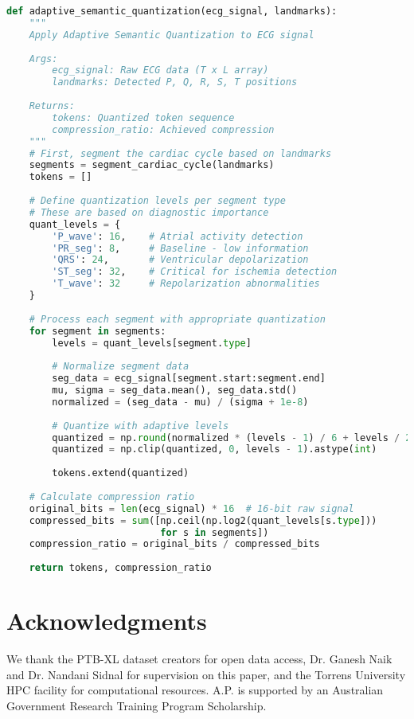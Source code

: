 \documentclass[journal]{IEEEtran}
\begin{document}
\begin{lstlisting}[language=Python, caption={Core ASQ Quantization Implementation}, label=lst:asq]
def adaptive_semantic_quantization(ecg_signal, landmarks):
    """
    Apply Adaptive Semantic Quantization to ECG signal
    
    Args:
        ecg_signal: Raw ECG data (T x L array)
        landmarks: Detected P, Q, R, S, T positions
    
    Returns:
        tokens: Quantized token sequence
        compression_ratio: Achieved compression
    """
    # First, segment the cardiac cycle based on landmarks
    segments = segment_cardiac_cycle(landmarks)
    tokens = []
    
    # Define quantization levels per segment type
    # These are based on diagnostic importance
    quant_levels = {
        'P_wave': 16,    # Atrial activity detection
        'PR_seg': 8,     # Baseline - low information
        'QRS': 24,       # Ventricular depolarization
        'ST_seg': 32,    # Critical for ischemia detection
        'T_wave': 32     # Repolarization abnormalities
    }
    
    # Process each segment with appropriate quantization
    for segment in segments:
        levels = quant_levels[segment.type]
        
        # Normalize segment data
        seg_data = ecg_signal[segment.start:segment.end]
        mu, sigma = seg_data.mean(), seg_data.std()
        normalized = (seg_data - mu) / (sigma + 1e-8)
        
        # Quantize with adaptive levels
        quantized = np.round(normalized * (levels - 1) / 6 + levels / 2)
        quantized = np.clip(quantized, 0, levels - 1).astype(int)
        
        tokens.extend(quantized)
    
    # Calculate compression ratio
    original_bits = len(ecg_signal) * 16  # 16-bit raw signal
    compressed_bits = sum([np.ceil(np.log2(quant_levels[s.type])) 
                           for s in segments])
    compression_ratio = original_bits / compressed_bits
    
    return tokens, compression_ratio
\end{lstlisting}

\section*{Acknowledgments}

We thank the PTB-XL dataset creators for open data access, Dr. Ganesh Naik and Dr. Nandani Sidnal for supervision on this paper, and the Torrens University HPC facility for computational resources. A.P. is supported by an Australian Government Research Training Program Scholarship.
\end{document}
